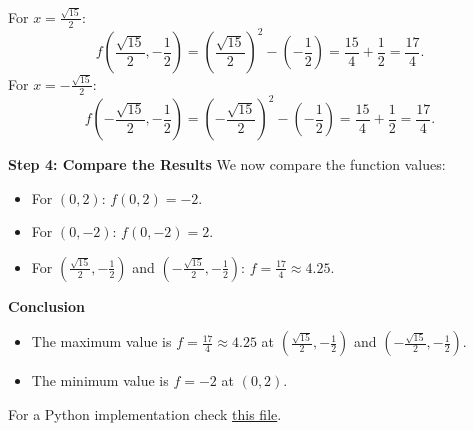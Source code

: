 For $x = \frac{\sqrt{15}}{2}$:
\[
f\left(\frac{\sqrt{15}}{2}, -\frac{1}{2}\right) = \left(\frac{\sqrt{15}}{2}\right)^2 - \left(-\frac{1}{2}\right) = \frac{15}{4} + \frac{1}{2} = \frac{17}{4}.
\]
For $x = -\frac{\sqrt{15}}{2}$:
\[
f\left(-\frac{\sqrt{15}}{2}, -\frac{1}{2}\right) = \left(-\frac{\sqrt{15}}{2}\right)^2 - \left(-\frac{1}{2}\right) = \frac{15}{4} + \frac{1}{2} = \frac{17}{4}.
\]

{\bf Step 4: Compare the Results}
We now compare the function values:
\begin{itemize}
    \item For $(0, 2)$: $f(0, 2) = -2$.
    \item For $(0, -2)$: $f(0, -2) = 2$.
    \item For $\left(\frac{\sqrt{15}}{2}, -\frac{1}{2}\right)$ and $\left(-\frac{\sqrt{15}}{2}, -\frac{1}{2}\right)$: $f = \frac{17}{4} \approx 4.25$.
\end{itemize}

{\bf Conclusion}
\begin{itemize}
    \item The maximum value is $f = \frac{17}{4} \approx 4.25$ at $\left(\frac{\sqrt{15}}{2}, -\frac{1}{2}\right)$ and $\left(-\frac{\sqrt{15}}{2}, -\frac{1}{2}\right)$.
    \item The minimum value is $f = -2$ at $(0, 2)$.
\end{itemize}

For a Python implementation check \href{https://github.com/Biocomputing-Teaching/ORcourse/blob/main/code/lagrange.py}{this file}.
